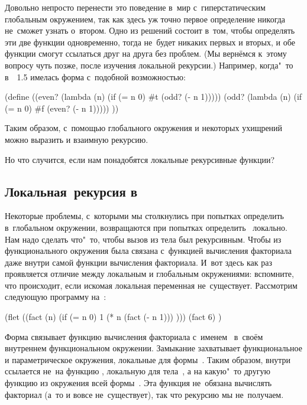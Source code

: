 Довольно непросто перенести это поведение в~мир с~гиперстатическим глобальным
окружением, так как здесь уж точно первое определение никогда не~сможет узнать
о~втором. Одно из решений состоит в~том, чтобы определять эти две функции
одновременно, тогда не~будет никаких первых и вторых, и обе функции смогут
ссылаться друг на друга без проблем. (Мы вернёмся к~этому вопросу чуть позже,
после изучения локальной рекурсии.) Например, когда"~то в~\LISP~1.5 имелась
форма  с~подобной возможностью:

\begin{code:lisp}
(define ((even? (lambda (n) (if (= n 0) #t (odd? (- n 1)))))
         (odd? (lambda (n) (if (= n 0) #f (even? (- n 1))))) ))
\end{code:lisp}

Таким образом, с~помощью глобального окружения и некоторых ухищрений можно
выразить и взаимную рекурсию.

Но что случится, если нам понадобятся локальные рекурсивные функции?


\subsection{\texorpdfstring{Локальная~рекурсия в~}%
{Локальная рекурсия в Lisp₂}}%
\label{lisp1-2-omega/recusion/ssect:local-lisp2}

Некоторые проблемы, с~которыми мы столкнулись при попытках определить~
в~глобальном окружении, возвращаются при попытках определить~ локально.
Нам надо сделать что"~то, чтобы вызов  из тела  был
рекурсивным. Чтобы  из функционального окружения была связана
с~функцией вычисления факториала даже внутри самой функции вычисления
факториала. И~вот здесь как раз проявляется отличие между локальным и
глобальным окружениями: вспомните, что происходит, если искомая локальная
переменная не~существует. Рассмотрим следующую программу на~:

\begin{code:lisp}
(flet ((fact (n) (if (= n 0) 1
                     (* n (fact (- n 1))) )))
  (fact 6) )
\end{code:lisp}

Форма  связывает функцию вычисления факториала с~именем~
в~своём внутреннем функциональном окружении. Замыкание захватывает
функциональное и параметрическое окружения, локальные для формы~. Таким
образом,  внутри  ссылается не~на функцию , локальную
для тела~, а на какую"~то другую функцию  из окружения всей
формы~. Эта функция не~обязана вычислять факториал (а~то и вовсе
не~существует), так что рекурсию мы не~получаем.

